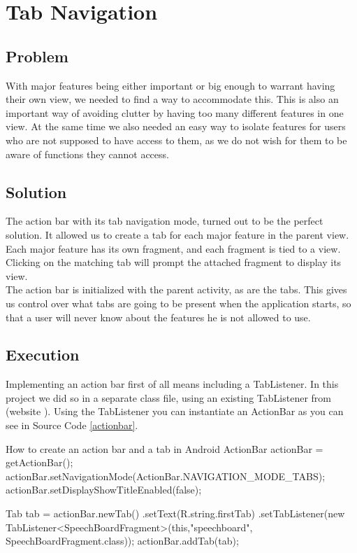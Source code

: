 \section{Tab Navigation} %
\subsection*{Problem}
With major features being either important or big enough to warrant having their own view, we needed to find a way to accommodate this.
This is also an important way of avoiding clutter by having too many different features in one view.
At the same time we also needed an easy way to isolate features for users who are not supposed to have access to them, as we do not wish for them to be aware of functions they cannot access.

\subsection*{Solution}
The action bar with its tab navigation mode, turned out to be the perfect solution. It allowed us to create a tab for each major feature in the parent view.
Each major feature has its own fragment, and each fragment is tied to a view. Clicking on the matching tab will prompt the attached fragment to display its view.\\
The action bar is initialized with the parent activity, as are the tabs.
This gives us control over what tabs are going to be present when the application starts, so that a user will never know about the features he is not allowed to use.

\subsection*{Execution}
Implementing an action bar first of all means including a TabListener.
In this project we did so in a separate class file, using an existing TabListener from (website \cite{actionbarguide}).
Using the TabListener you can instantiate an ActionBar as you can see in Source Code \ref{actionbar}.

\begin{source}[{actionbar}]{How to create an action bar and a tab in Android}
ActionBar actionBar = getActionBar();
actionBar.setNavigationMode(ActionBar.NAVIGATION_MODE_TABS); 
actionBar.setDisplayShowTitleEnabled(false);

Tab tab = actionBar.newTab()
		.setText(R.string.firstTab) 
		.setTabListener(new TabListener<SpeechBoardFragment>(this,"speechboard", SpeechBoardFragment.class));
actionBar.addTab(tab);
\end{source}

